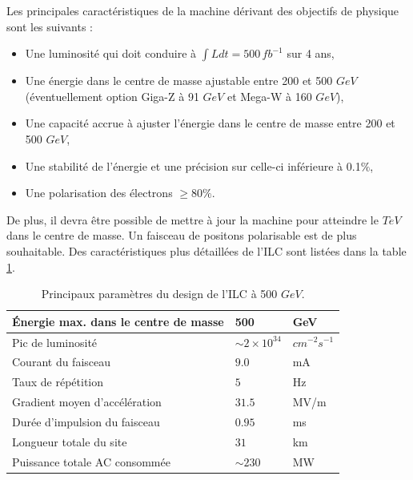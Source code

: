   Les principales caract\'eristiques de la machine d\'erivant des objectifs de physique sont les suivants : 
  
  \medskip
  
  \renewcommand{\labelitemi}{$\bullet$}
  
  \begin{itemize}
   
   \item Une luminosit\'e qui doit conduire \`a $\int L dt = 500 \, fb^{-1}$ sur 4 ans,
   
   \item Une \'energie dans le centre de masse ajustable entre 200 et 500 $GeV$ (\'eventuellement option Giga-Z \`a 91 $GeV$ et Mega-W \`a 160 $GeV$),
   
   \item Une capacit\'e accrue \`a ajuster l'énergie dans le centre de masse entre 200 et 500 $GeV$,
   
   \item Une stabilit\'e de l'\'energie et une pr\'ecision sur celle-ci inf\'erieure \`a 0.1$\%$,
   
   \item Une polarisation des \'electrons $\geq 80 \%$.
   
   \end{itemize}
  
  \medskip  

  
  De plus, il devra \^etre possible de mettre \`a jour la machine pour atteindre le $TeV$ dans le centre de masse. Un faisceau de positons polarisable est de plus souhaitable. Des caract\'eristiques plus d\'etaill\'ees de l'ILC sont list\'ees dans la table \ref{tab:paramILC}.
  
  \begin{table}[!htb]
  \begin{center}
  \begin{tabular}{|l|l|l|}  \hline
  Énergie max. dans le centre de masse & 500 & GeV  \\ \hline
  Pic de luminosit\'e & $\sim{2}\times10^{34}$ & $cm^{-2}s^{-1}$ \\ \hline
  Courant du faisceau & $9.0$ & mA \\ \hline
  Taux de r\'ep\'etition & $5$ & Hz \\ \hline
  Gradient moyen d'acc\'el\'eration & $31.5$ & MV/m \\ \hline
  Dur\'ee d'impulsion du faisceau & $0.95$ & ms \\ \hline
  Longueur totale du site & $31$ & km \\ \hline
  Puissance totale AC consomm\'ee & $\sim{230}$ & MW \\ \hline
  \end{tabular}
  \end{center}
  \caption{Principaux param\`etres du design de l'ILC \`a 500 $GeV$.}
  \label{tab:paramILC}
  \end{table}
  
